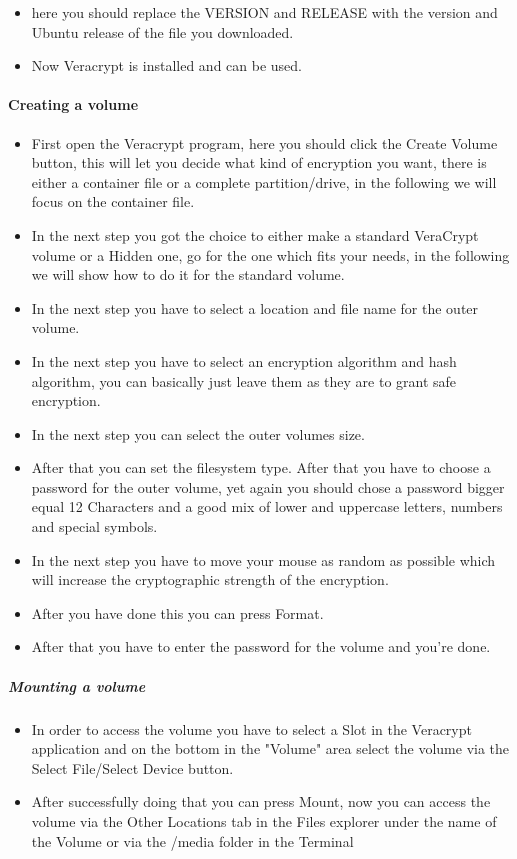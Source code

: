 \documentclass[a4paper,10pt]{article}
\begin{document}
\begin{itemize}[leftmargin=*]
\item here you should replace the VERSION and RELEASE with the version and Ubuntu release of the file you downloaded.
\item Now Veracrypt is installed and can be used.
\end{itemize}

\paragraph{Creating a volume}

\begin{itemize}[leftmargin=*]
\item First open the Veracrypt program, here you should click the Create Volume button, this will let you decide what kind of encryption you want, there is either a container file or a complete partition/drive, in the following we will focus on the container file. 
\item In the next step you got the choice to either make a standard VeraCrypt volume or a Hidden one, go for the one which fits your needs, in the following we will show how to do it for the standard volume.
\item In the next step you have to select a location and file name for the outer volume.
\item In the next step you have to select an encryption algorithm and hash algorithm, you can basically just leave them as they are to grant safe encryption.
\item In the next step you can select the outer volumes size.
\item After that you can set the filesystem type. After that you have to choose a password for the outer volume, yet again you should chose a password bigger equal 12 Characters and a good mix of lower and uppercase letters, numbers and special symbols.
\item In the next step you have to move your mouse as random as possible which will increase the cryptographic strength of the encryption.
\item After you have done this you can press Format.
\item After that you have to enter the password for the volume and you're done.
\end{itemize}

\subparagraph{Mounting a volume}

\begin{itemize}[leftmargin=*]
\item In order to access the volume you have to select a Slot in the Veracrypt application and on the bottom in the "Volume" area select the volume via the Select File/Select Device button.
\item After successfully doing that you can press Mount, now you can access the volume via the Other Locations tab in the Files explorer under the name of the Volume or via the /media folder in the Terminal
\end{itemize}
\end{document}
